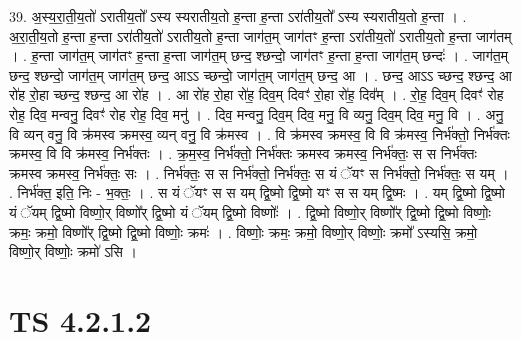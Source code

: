 \documentclass[17pt]{extarticle}
\begin{document}
39. अ॒स्य॒रा॒ती॒य॒तो॑ ऽरातीय॒तो᳚ ऽस्य स्यरातीय॒तो ह॒न्ता ह॒न्ता ऽरा॑तीय॒तो᳚ ऽस्य स्यरातीय॒तो ह॒न्ता । . अ॒रा॒ती॒य॒तो ह॒न्ता ह॒न्ता ऽरा॑तीय॒तो॑ ऽरातीय॒तो ह॒न्ता जाग॑त॒म् जाग॑तꣳ ह॒न्ता ऽरा॑तीय॒तो॑ ऽरातीय॒तो ह॒न्ता जाग॑तम् । . ह॒न्ता जाग॑त॒म् जाग॑तꣳ ह॒न्ता ह॒न्ता जाग॑त॒म् छन्द॒ श्छन्दो॒ जाग॑तꣳ ह॒न्ता ह॒न्ता जाग॑त॒म् छन्दः॑ । . जाग॑त॒म् छन्द॒ श्छन्दो॒ जाग॑त॒म् जाग॑त॒म् छन्द॒ आऽऽ च्छन्दो॒ जाग॑त॒म् जाग॑त॒म् छन्द॒ आ । . छन्द॒ आऽऽ च्छन्द॒ श्छन्द॒ आ रो॑ह रो॒हा च्छन्द॒ श्छन्द॒ आ रो॑ह । . आ रो॑ह रो॒हा रो॑ह॒ दिव॒म् दिवꣳ॑ रो॒हा रो॑ह॒ दिव᳚म् । . रो॒ह॒ दिव॒म् दिवꣳ॑ रोह रोह॒ दिव॒ मन्वनु॒ दिवꣳ॑ रोह रोह॒ दिव॒ मनु॑ । . दिव॒ मन्वनु॒ दिव॒म् दिव॒ मनु॒ वि व्यनु॒ दिव॒म् दिव॒ मनु॒ वि । . अनु॒ वि व्यन् वनु॒ वि क्र॑मस्व क्रमस्व॒ व्यन् वनु॒ वि क्र॑मस्व । . वि क्र॑मस्व क्रमस्व॒ वि वि क्र॑मस्व॒ निर्भ॑क्तो॒ निर्भ॑क्तः क्रमस्व॒ वि वि क्र॑मस्व॒ निर्भ॑क्तः । . क्र॒म॒स्व॒ निर्भ॑क्तो॒ निर्भ॑क्तः क्रमस्व क्रमस्व॒ निर्भ॑क्तः॒ स स निर्भ॑क्तः क्रमस्व क्रमस्व॒ निर्भ॑क्तः॒ सः । . निर्भ॑क्तः॒ स स निर्भ॑क्तो॒ निर्भ॑क्तः॒ स यं ॅयꣳ स निर्भ॑क्तो॒ निर्भ॑क्तः॒ स यम् । . निर्भ॑क्त॒ इति॒ निः - भ॒क्तः॒ । . स यं ॅयꣳ स स यम् द्वि॒ष्मो द्वि॒ष्मो यꣳ स स यम् द्वि॒ष्मः । . यम् द्वि॒ष्मो द्वि॒ष्मो यं ॅयम् द्वि॒ष्मो विष्णो॒र् विष्णो᳚र् द्वि॒ष्मो यं ॅयम् द्वि॒ष्मो विष्णोः᳚ । . द्वि॒ष्मो विष्णो॒र् विष्णो᳚र् द्वि॒ष्मो द्वि॒ष्मो विष्णोः॒ क्रमः॒ क्रमो॒ विष्णो᳚र् द्वि॒ष्मो द्वि॒ष्मो विष्णोः॒ क्रमः॑ । . विष्णोः॒ क्रमः॒ क्रमो॒ विष्णो॒र् विष्णोः॒ क्रमो᳚ ऽस्यसि॒ क्रमो॒ विष्णो॒र् विष्णोः॒ क्रमो॑ ऽसि । \newline
\pagebreak
{}

\section{ TS 4.2.1.2 }
\end{document}

